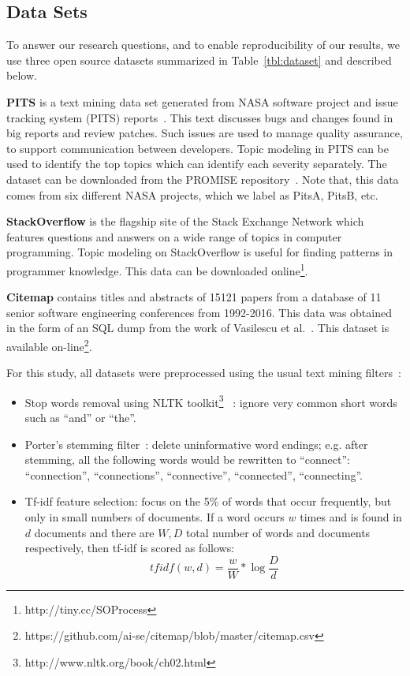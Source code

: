 \documentclass[twocolumn,5p,sort&compress]{elsarticle}
\newcommand{\bi}{\begin{itemize}}
\newcommand{\ei}{\end{itemize}}
\theoremstyle{break}
\begin{document}
\subsection{Data Sets}
To answer our research questions, and to enable reproducibility of our results,
we use three open source datasets summarized in Table~\ref{tbl:dataset} and described
below.

\textbf{PITS} is a text mining data set generated from NASA software project
and issue tracking system (PITS) reports~\cite{menzies2008improving,
  menzies2008automated}. This text discusses
bugs and changes found in big reports and  review patches.
Such issues are used
to manage quality assurance, to support communication
between developers. Topic modeling in PITS can be used
to identify the top topics which can
identify each severity separately. The dataset can be downloaded from the
PROMISE
repository~\cite{promiserepo}. Note that, this data comes from six different
NASA projects, which we label as PitsA, PitsB, etc.
    
 \textbf{StackOverflow} is the flagship site of the Stack Exchange Network which
 features questions and answers on a wide range of topics in computer
 programming.
Topic modeling on StackOverflow is useful for finding patterns in programmer knowledge.
 This data can be downloaded online\footnote{http://tiny.cc/SOProcess}. 
    
  \textbf{Citemap} contains titles and abstracts of 15121 papers from a
 database of 11 senior software engineering conferences from 1992-2016. This data was
 obtained in the form of an SQL dump from the work of Vasilescu et
 al.~\cite{vasilescu2013historical}.  This dataset is available on-line\footnote{https://github.com/ai-se/citemap/blob/master/citemap.csv}.

  For this study, all  datasets were preprocessed using the usual text mining filters~\cite{feldman2006j}:
\bi
\item
  Stop words removal using NLTK toolkit\footnote{http://www.nltk.org/book/ch02.html}~\cite{bird2006nltk} : ignore very common short words such as  ``and'' or ``the''.
\item
  Porter's stemming filter~\cite{Porter1980}: delete uninformative word endings; e.g. after stemming, all the following words would be rewritten
  to ``connect'': ``connection'', ``connections'',
``connective'',          
``connected'',
  ``connecting''.
\item
  Tf-idf feature selection: focus on the 5\% of words that occur frequently,
  but only in small numbers of documents. If a word occurs $w$ times
  and is found in $d$ documents  and there
  are $W,D$ total number of words and documents respectively, then tf-idf is scored
  as follows:
  \[
  \mathit{tfidf}(w,d)=   \frac{w}{W} *\log{\frac{D}{d}}\]
  \ei
\end{document}

